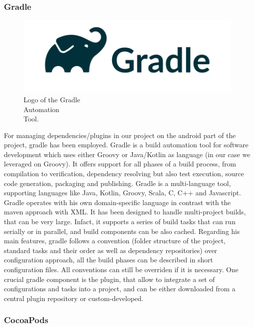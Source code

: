 \subsubsection{Gradle}
\label{subsubsec:gradle}

\begin{figure} %
    \centering
    \includegraphics[width=\linewidth]{images/gradle.png}
    \caption{Logo of the Gradle\\Automation\\Tool.}
\end{figure}

For managing dependencies/plugins in our project on the android part of the project, gradle has been employed. Gradle is a build automation tool for software development which uses either Groovy or Java/Kotlin as language (in our case we leveraged on Groovy). It offers support for all phases of a build process, from compilation to verification, dependency resolving but also test execution, source code generation, packaging and publishing. Gradle is a multi-language tool, supporting languages like Java, Kotlin, Groovy, Scala, C, C++ and Javascript. Gradle operates with his own domain-specific language in contrast with the maven approach with XML. It has been designed to handle multi-project builds, that can be very large. Infact, it supports a series of build tasks that can run serially or in parallel, and build components can be also cached. Regarding his main features, gradle follows a convention (folder structure of the project, standard tasks and their order as well as dependency repositories) over configuration approach, all the build phases can be described in short configuration files. All conventions can still be overriden if it is necessary. One crucial gradle component is the plugin, that allow to integrate a set of configurations and tasks into a project, and can be either downloaded from a central plugin repository or custom-developed\cite{Gradle}.

\subsubsection{CocoaPods}
\label{subsubsec:cocoapods}

